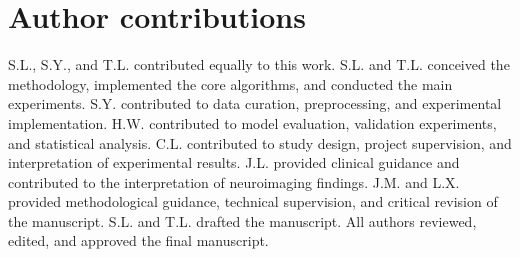 \documentclass[a4paper]{cas-sc}
\begin{document}
\section*{Author contributions}
S.L., S.Y., and T.L. contributed equally to this work. 
S.L. and T.L. conceived the methodology, implemented the core algorithms, and conducted the main experiments. 
S.Y. contributed to data curation, preprocessing, and experimental implementation. 
H.W. contributed to model evaluation, validation experiments, and statistical analysis. 
C.L. contributed to study design, project supervision, and interpretation of experimental results. 
J.L. provided clinical guidance and contributed to the interpretation of neuroimaging findings. 
J.M. and L.X. provided methodological guidance, technical supervision, and critical revision of the manuscript. 
S.L. and T.L. drafted the manuscript. 
All authors reviewed, edited, and approved the final manuscript. 
\clearpage


\end{document}
